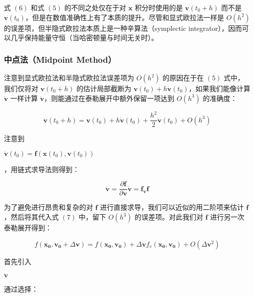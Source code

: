 \documentclass[UTF8]{ctexart}
\begin{document}
式 $(6)$ 和式 $(5)$ 的不同之处仅在于对 $\mathbf{x}$ 积分时使用的是 $\mathbf{v} (t_0 + h)$ 而不是 $\mathbf{v} (t_0)$，但是在数值准确性上有了本质的提升。尽管和显式欧拉法一样是 $O(h^2)$ 的误差项，但半隐式欧拉法本质上是一种辛算法（symplectic integrator），因而可以几乎保持能量守恒（当哈密顿量与时间无关时）。

\subsubsection{中点法（Midpoint Method）}

注意到显式欧拉法和半隐式欧拉法误差项为 $O(h^2)$ 的原因在于在 $(5)$ 式中，我们仅将对 $\mathbf{v}(t_0+h)$ 的估计局部截断为 $\mathbf{v}(t_0) + h \dot{\mathbf{v}}(t_0)$，如果我们能像计算 $\dot{\mathbf{v}}$ 一样计算 $\ddot{\mathbf{v}}$，则能通过在泰勒展开中额外保留一项达到 $O(h^3)$ 的准确度：

\begin{large}
\begin{equation}
\mathbf{v}(t_0+h) = \mathbf{v}(t_0) + h \dot{\mathbf{v}}(t_0) + \frac{h^2}{2} \ddot{\mathbf{v}}(t_0) + O(h^3)
\end{equation}
\end{large}

注意到 \begin{large}$\dot{\mathbf{v}}(t_0)=\mathbf{f}(\mathbf{x}(t_0), \mathbf{v}(t_0))$\end{large}，用链式求导法则得到：

\begin{large}
\begin{equation}
\ddot{\mathbf{v}} = \frac{\partial \mathbf{f}}{\partial \mathbf{v}} \dot{\mathbf{v}} = \mathbf{f_v} \mathbf{f}
\end{equation}
\end{large}

为了避免进行昂贵和复杂的对 $\mathbf{f}$ 进行直接求导，我们可以近似的用二阶项来估计 $\mathbf{f}$，然后将其代入式 $(7)$ 中，留下 $O(h^3)$ 的误差项。对此我们对 $\mathbf{f}$ 进行另一次泰勒展开得到：

\begin{large}
\begin{equation}
f(\mathbf{x_0}, \mathbf{v_0} + \Delta \mathbf{v}) = f(\mathbf{x_0}, \mathbf{v_0}) + \Delta \mathbf{v} f_v(\mathbf{x_0}, \mathbf{v_0}) + O(\Delta \mathbf{v}^2)
\end{equation}
\end{large}

首先引入 \begin{large} $\ddot{\mathbf{v}}$ \end{large} 通过选择：
\end{document}
